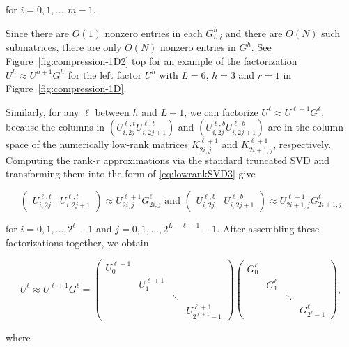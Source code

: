 for $i=0,1,\dots,m-1$.

Since there are $O(1)$ nonzero entries in each $G^{h}_{i,j}$ and there are $O(N)$ such submatrices, there are only $O(N)$ nonzero entries in $G^{h}$. See Figure~\ref{fig:compression-1D2} top for an example of the factorization $U^h\approx U^{h+1}G^h$ for the left factor $U^h$ with $L=6$, $h=3$ and $r=1$ in Figure~\ref{fig:compression-1D}.

Similarly, for any $\ell$ between $h$ and $L-1$, we can factorize
$U^\ell\approx U^{\ell+1}G^{\ell}$, because the columns in $\left(
U^{\ell,t}_{i,2j} U^{\ell,t}_{i,2j+1} \right)$ and $\left(
U^{\ell,b}_{i,2j} U^{\ell,b}_{i,2j+1} \right)$ are in the column space of the numerically low-rank matrices $K^{\ell+1}_{2i,j}$ and
$K^{\ell+1}_{2i+1,j}$, respectively. Computing the rank-$r$ approximations via the standard truncated {SVD} and transforming them into the form of \eqref{eq:lowrankSVD3} give

\begin{equation}
\begin{pmatrix}
U^{\ell,t}_{i,2j} &  U^{\ell,t}_{i,2j+1}
\end{pmatrix}
\approx U^{\ell+1}_{2i,j} G^{\ell}_{2i,j}
\text{   and   }
\begin{pmatrix}
U^{\ell,b}_{i,2j} & U^{\ell,b}_{i,2j+1}
\end{pmatrix}
\approx U^{\ell+1}_{2i+1,j} G^{\ell}_{2i+1,j}
\label{eq:RSh2}
\end{equation}

for $i=0,1,\dots,2^\ell-1$ and $j=0,1,\dots,2^{L-\ell-1}-1$.  After assembling these factorizations together, we obtain

\begin{equation*}
U^\ell\approx U^{\ell+1}G^{\ell}=
\begin{pmatrix}
U^{\ell+1}_{0} & & &\\
 & U^{\ell+1}_{1} & &\\
 & & \ddots &\\
 & & & U^{\ell+1}_{2^{\ell+1}-1}
\end{pmatrix}
\begin{pmatrix}
G^{\ell}_{0} & & &\\
 & G^{\ell}_{1} & &\\
 & & \ddots &\\
 & & & G^{\ell}_{2^\ell-1}
\end{pmatrix},
\end{equation*}

where

